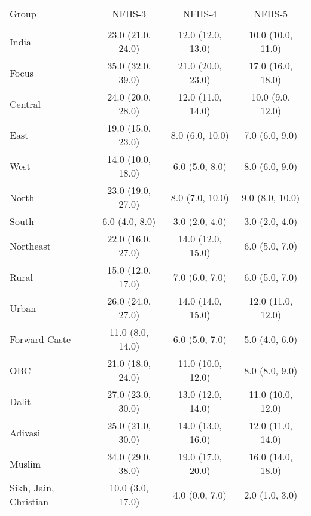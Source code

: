 \begin{tabular}{lccc}
\toprule
Group & NFHS-3 & NFHS-4 & NFHS-5 \\\\
\midrule
India&23.0 (21.0, 24.0)&12.0 (12.0, 13.0)&10.0 (10.0, 11.0)\\
Focus&35.0 (32.0, 39.0)&21.0 (20.0, 23.0)&17.0 (16.0, 18.0)\\
Central&24.0 (20.0, 28.0)&12.0 (11.0, 14.0)&10.0 (9.0, 12.0)\\
East&19.0 (15.0, 23.0)&8.0 (6.0, 10.0)&7.0 (6.0, 9.0)\\
West&14.0 (10.0, 18.0)&6.0 (5.0, 8.0)&8.0 (6.0, 9.0)\\
North&23.0 (19.0, 27.0)&8.0 (7.0, 10.0)&9.0 (8.0, 10.0)\\
South&6.0 (4.0, 8.0)&3.0 (2.0, 4.0)&3.0 (2.0, 4.0)\\
Northeast&22.0 (16.0, 27.0)&14.0 (12.0, 15.0)&6.0 (5.0, 7.0)\\
Rural&15.0 (12.0, 17.0)&7.0 (6.0, 7.0)&6.0 (5.0, 7.0)\\
Urban&26.0 (24.0, 27.0)&14.0 (14.0, 15.0)&12.0 (11.0, 12.0)\\
Forward Caste&11.0 (8.0, 14.0)&6.0 (5.0, 7.0)&5.0 (4.0, 6.0)\\
OBC&21.0 (18.0, 24.0)&11.0 (10.0, 12.0)&8.0 (8.0, 9.0)\\
Dalit&27.0 (23.0, 30.0)&13.0 (12.0, 14.0)&11.0 (10.0, 12.0)\\
Adivasi&25.0 (21.0, 30.0)&14.0 (13.0, 16.0)&12.0 (11.0, 14.0)\\
Muslim&34.0 (29.0, 38.0)&19.0 (17.0, 20.0)&16.0 (14.0, 18.0)\\
Sikh, Jain, Christian&10.0 (3.0, 17.0)&4.0 (0.0, 7.0)&2.0 (1.0, 3.0)\\
\bottomrule
\end{tabular}
